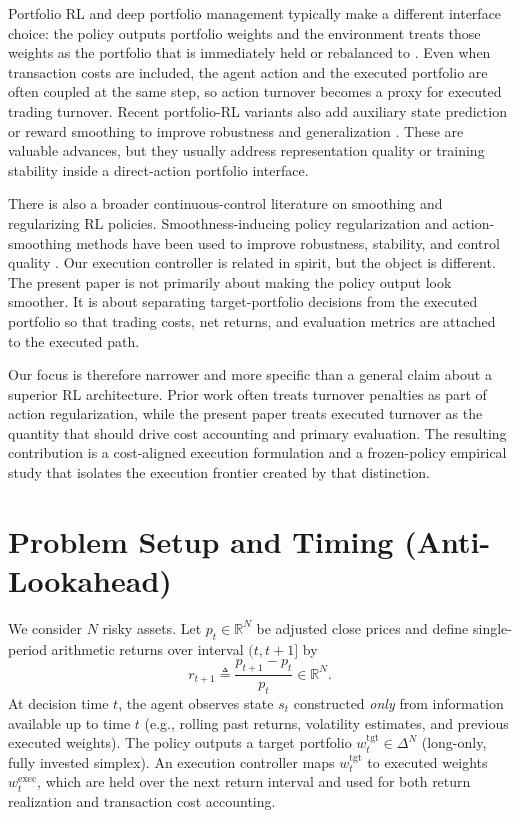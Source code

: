 \documentclass[10pt,twocolumn]{article}
\newcommand{\wexec}{w^{\mathrm{exec}}}
\newcommand{\wtgt}{w^{\mathrm{tgt}}}
\newcommand{\R}{\mathbb{R}}
\newcommand{\DeltaN}{\Delta^N}
\begin{document}
Portfolio RL and deep portfolio management typically make a different interface choice: the policy outputs portfolio weights and the environment treats those weights as the portfolio that is immediately held or rebalanced to \cite{moody1998,jiang2017,ye2020}. Even when transaction costs are included, the agent action and the executed portfolio are often coupled at the same step, so action turnover becomes a proxy for executed trading turnover. Recent portfolio-RL variants also add auxiliary state prediction or reward smoothing to improve robustness and generalization \cite{ye2020,lien2023}. These are valuable advances, but they usually address representation quality or training stability inside a direct-action portfolio interface.

There is also a broader continuous-control literature on smoothing and regularizing RL policies. Smoothness-inducing policy regularization and action-smoothing methods have been used to improve robustness, stability, and control quality \cite{shen2020,mysore2021}. Our execution controller is related in spirit, but the object is different. The present paper is not primarily about making the policy output look smoother. It is about separating target-portfolio decisions from the executed portfolio so that trading costs, net returns, and evaluation metrics are attached to the executed path.

Our focus is therefore narrower and more specific than a general claim about a superior RL architecture. Prior work often treats turnover penalties as part of action regularization, while the present paper treats executed turnover as the quantity that should drive cost accounting and primary evaluation. The resulting contribution is a cost-aligned execution formulation and a frozen-policy empirical study that isolates the execution frontier created by that distinction.

\section{Problem Setup and Timing (Anti-Lookahead)}
\label{sec:setup}
We consider $N$ risky assets. Let $p_t\in\R^N$ be adjusted close prices and define single-period arithmetic returns over interval $(t,t{+}1]$ by
\[
r_{t+1} \triangleq \frac{p_{t+1}-p_t}{p_t}\in\R^N.
\]
At decision time $t$, the agent observes state $s_t$ constructed \emph{only} from information available up to time $t$ (e.g., rolling past returns, volatility estimates, and previous executed weights). The policy outputs a target portfolio $\wtgt_t\in\DeltaN$ (long-only, fully invested simplex). An execution controller maps $\wtgt_t$ to executed weights $\wexec_t$, which are held over the next return interval and used for both return realization and transaction cost accounting.
\end{document}
